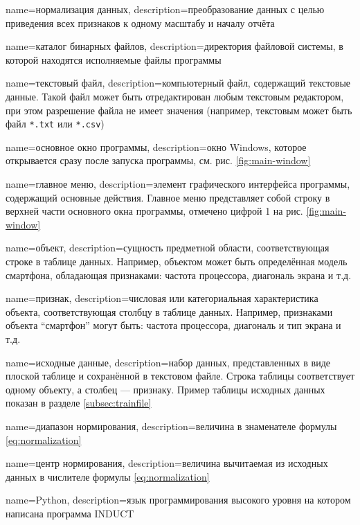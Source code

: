{
	name=нормализация данных,
	description={преобразование данных с целью приведения всех признаков к одному масштабу и началу отчёта}
}

{
	name=каталог бинарных файлов,
	description={директория файловой системы, в которой находятся исполняемые файлы программы}
}

{
	name=текстовый файл,
	description={компьютерный файл, содержащий текстовые данные. Такой файл может быть отредактирован любым текстовым редактором, при этом разрешение файла не имеет значения (например, текстовым может быть файл \texttt{*.txt} или \texttt{*.csv}) }
}

{
	name=основное окно программы,
	description={окно Windows, которое открывается сразу после запуска программы, см. рис. \ref{fig:main-window}}
}

{
	name=главное меню,
	description={элемент графического интерфейса программы, содержащий основные действия. Главное меню представляет собой строку в верхней части основного окна программы, отмечено цифрой 1 на рис. \ref{fig:main-window}}
}

{
	name=объект,
	description={сущность предметной области, соответствующая строке в таблице данных. Например, объектом может быть определённая модель смартфона, обладающая признаками: частота процессора, диагональ экрана и т.д.}
}


{
	name=признак,
	description={числовая или категориальная характеристика объекта, соответствующая столбцу в таблице данных. Например, признаками объекта ``смартфон'' могут быть:  частота процессора, диагональ и тип экрана и т.д.}
}


{
	name=исходные данные,
	description={набор данных, представленных в виде плоской таблице и сохранённой в текстовом файле. Строка таблицы соответствует одному объекту, а столбец --- признаку. Пример таблицы исходных данных показан в разделе \ref{subsec:trainfile}}
}

{
	name=диапазон нормирования,
	description={величина в знаменателе формулы \ref{eq:normalization}}
}

{
	name=центр нормирования,
	description={величина вычитаемая из исходных данных в числителе формулы \ref{eq:normalization}}
}

{
	name=Python,
	description={язык программирования высокого уровня на котором написана программа INDUCT}
}


